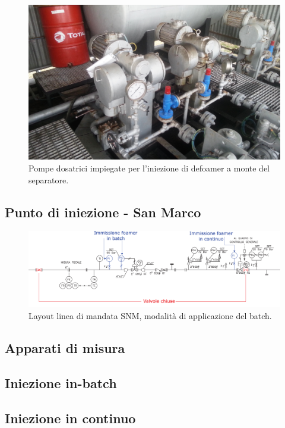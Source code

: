 \begin{figure}[ht] %
    \centering
    \includegraphics[width=\textwidth]{fig/test/defoamerpump.jpg}
    \caption{Pompe dosatrici impiegate per l'iniezione di defoamer a monte del separatore.} 
    \label{fig:defoamerpump}
\end{figure}

\subsection{Punto di iniezione - San Marco}

\begin{figure}[!htbp] %
    \centering
    \includegraphics[width=\textwidth]{fig/test/mandata.eps}
    \caption{Layout linea di mandata SNM, modalità di applicazione del batch.} 
    \label{fig:mandata}
\end{figure}

\subsection{Apparati di misura}
\subsection{Iniezione in-batch}
\subsection{Iniezione in continuo}

